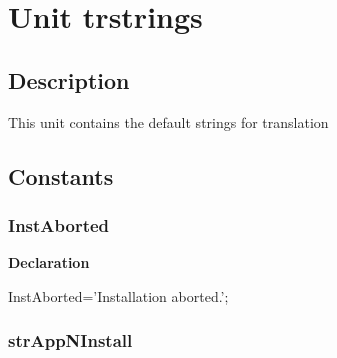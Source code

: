 \documentclass{report}
\newif\ifpdf
\begin{document}
\chapter{Unit trstrings}
\label{trstrings}
\section{Description}
This unit contains the default strings for translation
\section{Constants}
\ifpdf
\subsection*{\large{\textbf{InstAborted}}\normalsize\hspace{1ex}\hrulefill}
\else
\subsection*{InstAborted}
\fi
\label{trstrings-InstAborted}
\begin{list}{}{
\setlength{\itemindent}{0cm}
\setlength{\listparindent}{0cm}
\setlength{\leftmargin}{\evensidemargin}
\addtolength{\leftmargin}{\tmplength}
\settowidth{\labelsep}{X}
\addtolength{\leftmargin}{\labelsep}
\setlength{\labelwidth}{\tmplength}
}
\item[\textbf{Declaration}\hfill]
\ifpdf
\begin{flushleft}
\fi
\begin{ttfamily}
InstAborted='Installation aborted.';\end{ttfamily}

\ifpdf
\end{flushleft}
\fi

\end{list}
\ifpdf
\subsection*{\large{\textbf{strAppNInstall}}\normalsize\hspace{1ex}\hrulefill}
\else
\end{document}
